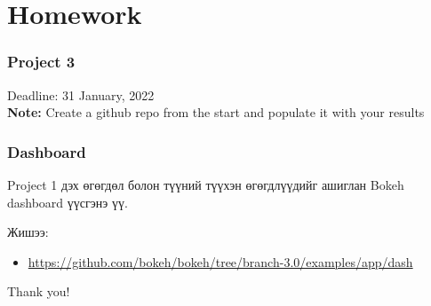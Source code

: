 \documentclass{beamer}
\begin{document}
\section{Homework} 

\begin{frame}
    \frametitle{Project 3}
\vskip 2mm
Deadline: 31 January, 2022 \\

\vfill
\textbf{Note:} Create a github repo from the start and populate it with your results
\end{frame}

\begin{frame}
    \frametitle{Dashboard}
    Project 1 дэх өгөгдөл болон түүний түүхэн өгөгдлүүдийг ашиглан Bokeh dashboard үүсгэнэ үү. 

    Жишээ: 

    \begin{itemize}
        \item \url{https://github.com/bokeh/bokeh/tree/branch-3.0/examples/app/dash}
    \end{itemize}
\end{frame}


\begin{frame}
\Huge{\centerline{Thank you!}}
\end{frame}

\end{document}

